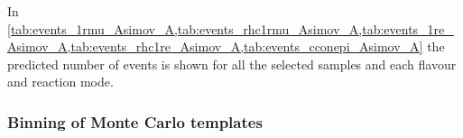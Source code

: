 In \cref{tab:events_1rmu_Asimov_A,tab:events_rhc1rmu_Asimov_A,tab:events_1re_Asimov_A,tab:events_rhc1re_Asimov_A,tab:events_cconepi_Asimov_A}
the predicted number of events is shown for all the selected samples 
and each flavour and reaction mode.







\subsubsection {Binning of Monte Carlo templates}
\label{sec:mc_templates:template_binning}



